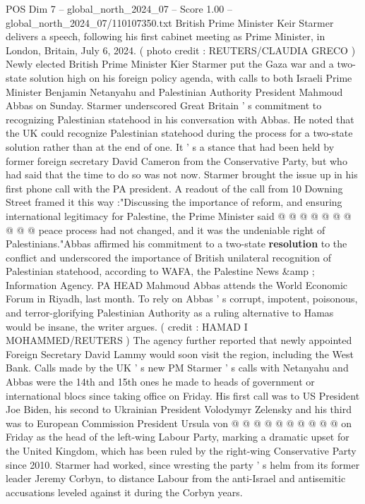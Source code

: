 \begin{textsample}{POS Dim 7 – global\_north\_2024\_07 – Score 1.00 – global\_north\_2024\_07/110107350.txt}  \label{ex:f7_pos_336}
British Prime Minister Keir Starmer delivers a speech, following his first cabinet meeting as Prime Minister, in London, Britain, July 6, 2024. ( photo credit : REUTERS/CLAUDIA GRECO ) Newly elected British Prime Minister Kier Starmer put the Gaza war and a two-state solution high on his foreign policy agenda, with calls to both Israeli Prime Minister Benjamin Netanyahu and Palestinian Authority President Mahmoud Abbas on Sunday.
Starmer underscored Great Britain ' s commitment to recognizing Palestinian statehood in his conversation with Abbas.
He noted that the UK could recognize Palestinian statehood during the process for a two-state solution rather than at the end of one.
It ' s a stance that had been held by former foreign secretary David Cameron from the Conservative Party, but who had said that the time to do so was not now.
Starmer brought the issue up in his first phone call with the PA president.
A readout of the call from 10 Downing Street framed it this way :"Discussing the importance of reform, and ensuring international legitimacy for Palestine, the Prime Minister said @ @ @ @ @ @ @ @ @ @ peace process had not changed, and it was the undeniable right of Palestinians."Abbas affirmed his commitment to a two-state \textbf{resolution} to the conflict and underscored the importance of British unilateral recognition of Palestinian statehood, according to WAFA, the Palestine News \&amp ; Information Agency.
PA HEAD Mahmoud Abbas attends the World Economic Forum in Riyadh, last month.
To rely on Abbas ' s corrupt, impotent, poisonous, and terror-glorifying Palestinian Authority as a ruling alternative to Hamas would be insane, the writer argues. ( credit : HAMAD I MOHAMMED/REUTERS ) The agency further reported that newly appointed Foreign Secretary David Lammy would soon visit the region, including the West Bank.
Calls made by the UK ' s new PM Starmer ' s calls with Netanyahu and Abbas were the 14th and 15th ones he made to heads of government or international blocs since taking office on Friday.
His first call was to US President Joe Biden, his second to Ukrainian President Volodymyr Zelensky and his third was to European Commission President Ursula von @ @ @ @ @ @ @ @ @ @ on Friday as the head of the left-wing Labour Party, marking a dramatic upset for the United Kingdom, which has been ruled by the right-wing Conservative Party since 2010.
Starmer had worked, since wresting the party ' s helm from its former leader Jeremy Corbyn, to distance Labour from the anti-Israel and antisemitic accusations leveled against it during the Corbyn years.

\end{textsample}
